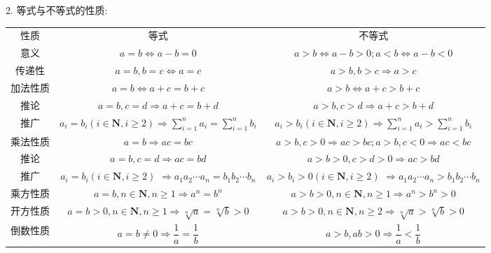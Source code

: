 2. 等式与不等式的性质:

\begin{center}
\begin{tabular}{|c|c|c|}
\hline
性质 & 等式 & 不等式 \\
\cline{1-3}
意义 & $a = b \Leftrightarrow  a - b = 0$ & $a > b \Leftrightarrow  a - b > 0;a < b \Leftrightarrow  a - b < 0$ \\
\cline{1-3}
传递性 & $a = b,b = c \Leftrightarrow  a = c$ & $a > b,b > c \Rightarrow  a > c$ \\
\cline{1-3}
加法性质 & $a = b \Leftrightarrow  a + c = b + c$ & $a > b \Leftrightarrow  a + c > b + c$ \\
\cline{1-3}
推论 & $a = b,c = d \Rightarrow  a + c = b + d$ & $a > b,c > d \Rightarrow  a + c > b + d$ \\
\cline{1-3}
推广 & ${a}_{i} = {b}_{i}\left( {i \in  \mathbf{N},i \geq  2}\right)  \Rightarrow  \mathop{\sum }\limits_{{i = 1}}^{n}{a}_{i} = \mathop{\sum }\limits_{{i = 1}}^{n}{b}_{i}$ & ${a}_{i} > {b}_{i}\left( {i \in  \mathbf{N},i \geq  2}\right)  \Rightarrow  \mathop{\sum }\limits_{{i = 1}}^{n}{a}_{i} > \mathop{\sum }\limits_{{i = 1}}^{n}{b}_{i}$ \\
\cline{1-3}
乘法性质 & $a = b \Rightarrow  {ac} = {bc}$ & $a > b,c > 0 \Rightarrow  {ac} > {bc};a > b,c < 0 \Rightarrow  {ac} < {bc}$ \\
\cline{1-3}
推论 & $a = b,c = d \Rightarrow  {ac} = {bd}$ & $a > b > 0,c > d > 0 \Rightarrow  {ac} > {bd}$ \\
\cline{1-3}
推广 & \makecell{ ${a}_{i} = {b}_{i}\left( {i \in  \mathbf{N},i \geq  2}\right)$ \\ $\Rightarrow  {a}_{1}{a}_{2}\cdots {a}_{n} = {b}_{1}{b}_{2}\cdots {b}_{n}$ } & \makecell{ ${a}_{i} > {b}_{i} > 0\left( {i \in  \mathbf{N},i \geq  2}\right)$ \\ $\Rightarrow  {a}_{1}{a}_{2}\cdots {a}_{n} > {b}_{1}{b}_{2}\cdots {b}_{n}$ } \\
\cline{1-3}
乘方性质 & $a = b,n \in  \mathbf{N},n \geq  1 \Rightarrow  {a}^{n} = {b}^{n}$ & $a > b > 0,n \in  \mathbf{N},n \geq  1 \Rightarrow  {a}^{n} > {b}^{n} > 0$ \\
\cline{1-3}
开方性质 & $a = b > 0,n \in  \mathbf{N},n \geq  1 \Rightarrow  \sqrt[n]{a} = \sqrt[n]{b} > 0$ & $a > b > 0,n \in  \mathbf{N},n \geq  2 \Rightarrow  \sqrt[n]{a} > \sqrt[n]{b} > 0$ \\
\cline{1-3}
倒数性质 & $a = b \neq  0 \Rightarrow  \dfrac{1}{a} = \dfrac{1}{b}$ & $a > b,{ab} > 0 \Rightarrow  \dfrac{1}{a} < \dfrac{1}{b}$ \\
\cline{1-3}
\hline
\end{tabular}
\end{center}

